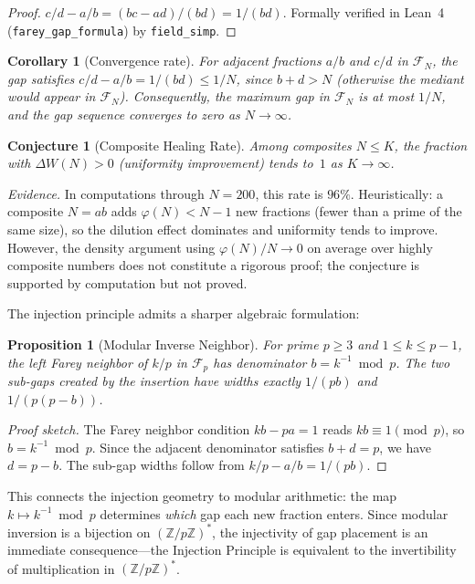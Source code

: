 \documentclass[11pt]{article}
\newtheorem{proposition}[theorem]{Proposition}
\newtheorem{corollary}[theorem]{Corollary}
\newtheorem{conjecture}[theorem]{Conjecture}
\theoremstyle{definition}
\newcommand{\Z}{\mathbb{Z}}
\newcommand{\F}{\mathcal{F}}
\begin{document}
\begin{proof}
$c/d - a/b = (bc - ad)/(bd) = 1/(bd)$.
Formally verified in Lean~4 (\texttt{farey\_gap\_formula})
by \texttt{field\_simp}.
\end{proof}

\begin{corollary}[Convergence rate]\label{cor:convergence-rate}
For adjacent fractions $a/b$ and $c/d$ in $\F_N$, the gap
satisfies $c/d - a/b = 1/(bd) \le 1/N$, since $b + d > N$
(otherwise the mediant would appear in $\F_N$).  Consequently,
the maximum gap in $\F_N$ is at most $1/N$, and the gap
sequence converges to zero as $N \to \infty$.
\end{corollary}

\begin{conjecture}[Composite Healing Rate]\label{thm:healing}
Among composites $N \le K$, the fraction with
$\Delta W(N) > 0$ (uniformity improvement) tends to~$1$
as $K \to \infty$.
\end{conjecture}

\noindent\emph{Evidence.}
In computations through $N = 200$, this rate is $96\%$.
Heuristically: a composite $N = ab$ adds $\varphi(N) < N-1$ new
fractions (fewer than a prime of the same size), so the dilution
effect dominates and uniformity tends to improve.  However, the
density argument using $\varphi(N)/N \to 0$ on average over highly
composite numbers does not constitute a rigorous proof; the
conjecture is supported by computation but not proved.

The injection principle admits a sharper algebraic formulation:

\begin{proposition}[Modular Inverse Neighbor]\label{prop:mod-inv}
For prime $p \ge 3$ and $1 \le k \le p-1$, the left Farey neighbor
of $k/p$ in $\F_p$ has denominator $b = k^{-1} \bmod p$.  The two
sub-gaps created by the insertion have widths exactly $1/(pb)$ and
$1/(p(p-b))$.
\end{proposition}

\begin{proof}[Proof sketch]
The Farey neighbor condition $kb - pa = 1$ reads $kb \equiv 1 \pmod{p}$,
so $b = k^{-1} \bmod p$.  Since the adjacent denominator satisfies
$b + d = p$, we have $d = p - b$.  The sub-gap widths follow from
$k/p - a/b = 1/(pb)$.
\end{proof}

\noindent This connects the injection geometry to modular arithmetic:
the map $k \mapsto k^{-1} \bmod p$ determines \emph{which} gap
each new fraction enters.  Since modular inversion is a bijection
on $(\Z/p\Z)^*$, the injectivity of gap placement is an immediate
consequence---the Injection Principle is equivalent to the
invertibility of multiplication in $(\Z/p\Z)^*$.
\end{document}
